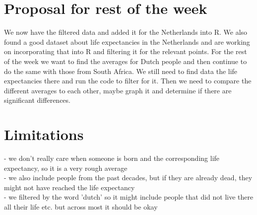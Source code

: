 \documentclass{article}
\begin{document}
\section{Proposal for rest of the week}
We now have the filtered data and added it for the Netherlands into R. We also found a good dataset about life expectancies in the Netherlands and are working on incorporating that into R and filtering it for the relevant points. For the rest of the week we want to find the averages for Dutch people and then continue to do the same with those from South Africa. We still need to find data the life expectancies there and run the code to filter for it. Then we need to compare the different averages to each other, maybe graph it and determine if there are significant differences. 

\section{Limitations}
- we don't really care when someone is born and the corresponding life expectancy, so it is a very rough average\\
- we also include people from the past decades, but if they are already dead, they might not have reached the life expectancy\\
- we filtered by the word 'dutch' so it might include people that did not live there all their life etc. but across most it should be okay\\
\end{document}
